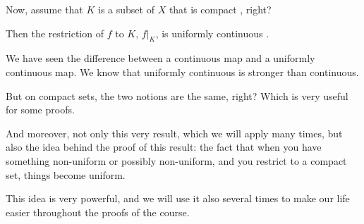 \begin{hidden}
\end{hidden}

\begin{speech}[01:13:20 - 01:15:07]
Now, assume that $K$ is a subset of $X$ that is compact , right?

Then the restriction of $f$ to $K$, $f|_K$, is uniformly continuous .

We have seen the difference between a continuous map and a uniformly continuous map. We know that uniformly continuous is stronger than continuous.

But on compact sets, the two notions are the same, right? Which is very useful for some proofs.

And moreover, not only this very result, which we will apply many times, but also the idea behind the proof of this result: the fact that when you have something non-uniform or possibly non-uniform, and you restrict to a compact set, things become uniform.

This idea is very powerful, and we will use it also several times to make our life easier throughout the proofs of the course.
\end{speech}

\begin{content}
\end{content}

